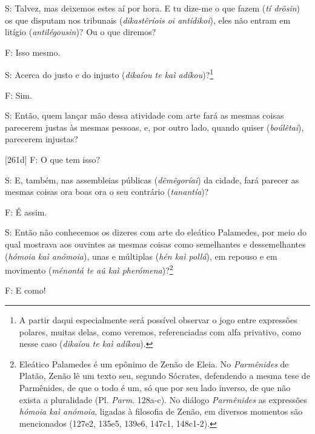 S: Talvez, mas deixemos estes aí por hora. E tu dize-me o que fazem
(\emph{tí drôsin}) os que disputam nos tribunais (\emph{dikastêríois oi
antídikoi}), eles não entram em litígio (\emph{antilégousin})? Ou o que
diremos?

F: Isso mesmo.

S: Acerca do justo e do injusto (\emph{dikaíou te kaì
adíkou})?\footnote{A partir daqui especialmente será possível observar o
  jogo entre expressões polares, muitas delas, como veremos,
  referenciadas com alfa privativo, como nesse caso (\emph{dikaíou te
  kaì adíkou}).}

F: Sim.

S: Então, quem lançar mão dessa atividade com arte fará as mesmas coisas
parecerem justas às mesmas pessoas, e, por outro lado, quando quiser
(\emph{boúlêtai}), parecerem injustas?

{[}261d{]} F: O que tem isso?

S: E, também, nas assembleias públicas (\emph{dêmêgoríai}) da cidade,
fará parecer as mesmas coisas ora boas ora o seu contrário
(\emph{tanantía})?

F: É assim.

S: Então não conhecemos os dizeres com arte do eleático Palamedes, por
meio do qual mostrava aos ouvintes as mesmas coisas como semelhantes e
dessemelhantes (\emph{hómoia kaì anómoia}), unas e múltiplas (\emph{hén
kaì pollá}), em repouso e em movimento (\emph{ménontá te aû kaì
pherómena})?\footnote{Eleático Palamedes é um epônimo de Zenão de Eleia.
  No \emph{Parmênides} de Platão, Zenão lê um texto seu, segundo
  Sócrates, defendendo a mesma tese de Parmênides, de que o todo é um,
  só que por seu lado inverso, de que não exista a pluralidade (Pl.
  \emph{Parm}. 128a-c). No diálogo \emph{Parmênides} as expressões
  \emph{hómoia kaì anómoia}, ligadas à filosofia de Zenão, em diversos
  momentos são mencionados (127e2, 135e5, 139e6, 147c1, 148c1-2).}

F: E como!

